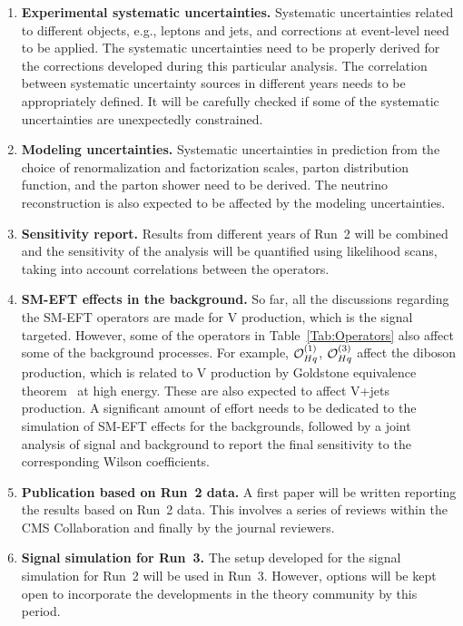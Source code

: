 \documentclass[a4paper,11pt]{article}
\renewcommand{\PV}{{{{V}}}\xspace}
\newcommand{\VH}{{{\PV}{\PH}}\xspace}
\begin{document}
\begin{enumerate}[noitemsep,topsep=0pt]
\item {\bf Experimental systematic uncertainties.} Systematic uncertainties related to different objects, e.g., leptons and jets, and corrections at event-level need to be applied. 
The systematic uncertainties need to be properly derived for the corrections developed during this particular analysis. 
The correlation between systematic uncertainty sources in different years needs to be appropriately defined. 
It will be carefully checked if some of the systematic uncertainties are unexpectedly constrained. 

\item {\bf Modeling uncertainties.} Systematic uncertainties in prediction from the choice of renormalization and factorization scales,  parton distribution function,  and the parton shower need to be derived. 
The neutrino reconstruction is also expected to be affected by the modeling uncertainties. 

\item {\bf Sensitivity report.} Results from different years of Run~2 will be combined and
the sensitivity of the analysis will be quantified using likelihood scans, taking into account correlations between the operators. 

\item {\bf SM-EFT effects in the background.} So far, all the discussions regarding the SM-EFT operators are made for \VH production, which is the signal targeted. However, some of the operators in Table~\ref{Tab:Operators} also affect some of the background processes. 
For example, ${\cal O}^{(1)}_{Hq}$, ${\cal O}^{(3)}_{Hq}$ affect the diboson production, which is related to \VH production by Goldstone equivalence theorem~\cite{PhysRevD.10.1145} at high energy. 
These are also expected to affect {\PV}+jets production. 
A significant amount of effort needs to be dedicated to the simulation of SM-EFT effects for the backgrounds, followed by a joint analysis of signal and background to report the final sensitivity to the corresponding Wilson coefficients. 

\item {\bf Publication based on Run~2 data.} A first paper will be written reporting the results based on Run~2 data. This involves a series of reviews within the CMS Collaboration and finally by the journal reviewers. 

\item {\bf Signal simulation for Run~3.} The setup developed for the signal simulation for Run~2 will be used in Run~3. However, options will be kept open to incorporate the developments in the theory community by this period. 


\end{enumerate}
\end{document}
